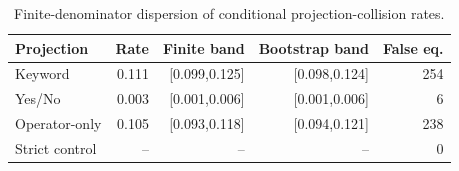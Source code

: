 \begin{table}[H]
\centering
\caption{Finite-denominator dispersion of conditional projection-collision rates.}
\label{tab:stat-robustness}
\small
\begin{tabular}{lrrrr}
\toprule
Projection & Rate & Finite band & Bootstrap band & False eq. \\
\midrule
Keyword & 0.111 & [0.099,0.125] & [0.098,0.124] & 254 \\
Yes/No & 0.003 & [0.001,0.006] & [0.001,0.006] & 6 \\
Operator-only & 0.105 & [0.093,0.118] & [0.094,0.121] & 238 \\
Strict control & -- & -- & -- & 0 \\
\bottomrule
\end{tabular}
\end{table}
